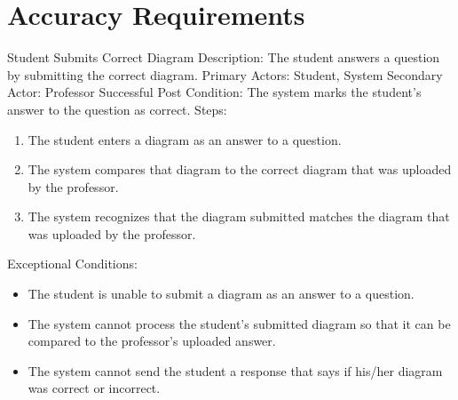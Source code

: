 
\chapter{Accuracy Requirements}

    \begin{section}{Student Submits Correct Diagram}
        Description: The student answers a question by submitting the correct diagram. \newline
        Primary Actors: Student, System \newline
        Secondary Actor: Professor \newline
        Successful Post Condition: The system marks the student’s answer to the question as correct. \newline
        Steps:
        \begin{enumerate}
            \item{The student enters a diagram as an answer to a question.}
            \item{The system compares that diagram to the correct diagram that was uploaded by the professor.}
            \item{The system recognizes that the diagram submitted matches the diagram that was uploaded by the professor.}
        \end{enumerate}
        Exceptional Conditions:
        \begin{itemize}
            \item{The student is unable to submit a diagram as an answer to a question.}
            \item{The system cannot process the student’s submitted diagram so that it can be compared to the professor’s uploaded answer.}
            \item{The system cannot send the student a response that says if his/her diagram was correct or incorrect.}
        \end{itemize}
    \end{section}

